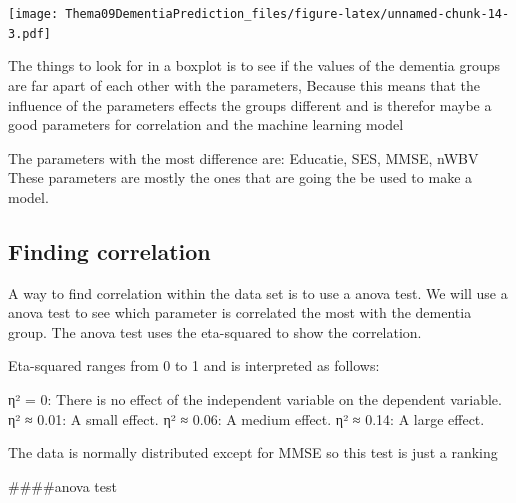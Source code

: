 \documentclass[
]{article}
\newenvironment{Shaded}{\begin{snugshade}}{\end{snugshade}}
\newcommand{\FunctionTok}[1]{\textcolor[rgb]{0.00,0.00,0.00}{#1}}
\newcommand{\NormalTok}[1]{#1}
\newcommand{\OtherTok}[1]{\textcolor[rgb]{0.56,0.35,0.01}{#1}}
\newcommand{\SpecialCharTok}[1]{\textcolor[rgb]{0.00,0.00,0.00}{#1}}
\newcommand{\StringTok}[1]{\textcolor[rgb]{0.31,0.60,0.02}{#1}}
\begin{document}
\texttt{[image: Thema09DementiaPrediction\_files/figure-latex/unnamed-chunk-14-3.pdf]}

\begin{Shaded}
\end{Shaded}

The things to look for in a boxplot is to see if the values of the
dementia groups are far apart of each other with the parameters, Because
this means that the influence of the parameters effects the groups
different and is therefor maybe a good parameters for correlation and
the machine learning model

The parameters with the most difference are: Educatie, SES, MMSE, nWBV
These parameters are mostly the ones that are going the be used to make
a model.

\hypertarget{finding-correlation}{%
\subsection{Finding correlation}\label{finding-correlation}}

A way to find correlation within the data set is to use a anova test. We
will use a anova test to see which parameter is correlated the most with
the dementia group. The anova test uses the eta-squared to show the
correlation.

Eta-squared ranges from 0 to 1 and is interpreted as follows:

η² = 0: There is no effect of the independent variable on the dependent
variable. η² ≈ 0.01: A small effect. η² ≈ 0.06: A medium effect. η² ≈
0.14: A large effect.

The data is normally distributed except for MMSE so this test is just a
ranking

\#\#\#\#anova test
\end{document}
